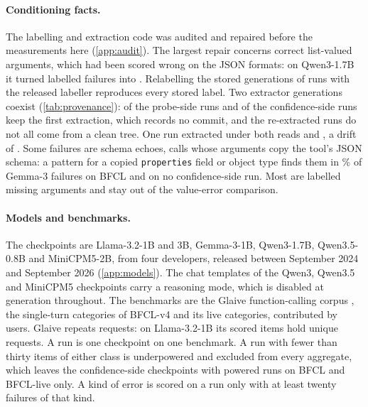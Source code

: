 \paragraph{Conditioning facts.}
The labelling and extraction code was audited and repaired before the measurements here (\cref{app:audit}). The largest repair concerns correct list-valued arguments, which had been scored wrong on the JSON formats: on Qwen3-1.7B it turned \repPosBeforeQwenThreeBfcl{} labelled failures into \repPosAfterQwenThreeBfcl{}. Relabelling the stored generations of \nRelabelRuns{} runs with the released labeller reproduces every stored label. Two extractor generations coexist (\cref{tab:provenance}): \nFirstExtractInternals{} of the \nInternalsRuns{} probe-side runs and \nFirstExtractConfidence{} of the \nConfidenceRuns{} confidence-side runs keep the first extraction, which records no commit, and the re-extracted runs do not all come from a clean tree. One run extracted under both reads \replGapStale{} and \replGapClean{}, a drift of \replGapDelta{}. Some failures are schema echoes, calls whose arguments copy the tool's JSON schema: a pattern for a copied \texttt{properties} field or object type finds them in \echoPosGemmaBfcl{}\% of Gemma-3 failures on BFCL and on no confidence-side run. Most are labelled missing arguments and stay out of the value-error comparison.

\paragraph{Models and benchmarks.}
The checkpoints are Llama-3.2-1B and 3B, Gemma-3-1B, Qwen3-1.7B, Qwen3.5-0.8B and MiniCPM5-2B, from four developers, released between September 2024 and September 2026 (\cref{app:models}). The chat templates of the Qwen3, Qwen3.5 and MiniCPM5 checkpoints carry a reasoning mode, which is disabled at generation throughout. The benchmarks are the Glaive function-calling corpus \citep{glaive2024}, the single-turn categories of BFCL-v4 \citep{patil2025bfcl} and its live categories, contributed by users. Glaive repeats requests: on Llama-3.2-1B its \gdNScoredLlamaOneBGlaive{} scored items hold \gdNUniquePromptsLlamaOneBGlaive{} unique requests. A run is one checkpoint on one benchmark. A run with fewer than thirty items of either class is underpowered and excluded from every aggregate, which leaves the confidence-side checkpoints with powered runs on BFCL and BFCL-live only. A kind of error is scored on a run only with at least twenty failures of that kind.

